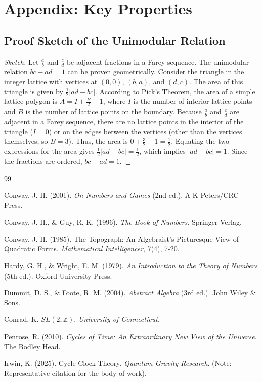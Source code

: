 \documentclass[12pt,a4paper]{article}
\theoremstyle{plain}
\theoremstyle{definition}
\theoremstyle{remark}
\begin{document}
\appendix
\section{Appendix: Key Properties}

\subsection{Proof Sketch of the Unimodular Relation}
\begin{proof}[Sketch]
Let $\frac{a}{b}$ and $\frac{c}{d}$ be adjacent fractions in a Farey sequence. The unimodular relation $bc - ad = 1$ can be proven geometrically. Consider the triangle in the integer lattice with vertices at $(0,0)$, $(b,a)$, and $(d,c)$. The area of this triangle is given by $\frac{1}{2}|ad - bc|$. According to Pick's Theorem, the area of a simple lattice polygon is $A = I + \frac{B}{2} - 1$, where $I$ is the number of interior lattice points and $B$ is the number of lattice points on the boundary. Because $\frac{a}{b}$ and $\frac{c}{d}$ are adjacent in a Farey sequence, there are no lattice points in the interior of the triangle ($I=0$) or on the edges between the vertices (other than the vertices themselves, so $B=3$). Thus, the area is $0 + \frac{3}{2} - 1 = \frac{1}{2}$. Equating the two expressions for the area gives $\frac{1}{2}|ad - bc| = \frac{1}{2}$, which implies $|ad - bc| = 1$. Since the fractions are ordered, $bc - ad = 1$.
\end{proof}

\begin{thebibliography}{99}

Conway, J. H. (2001). \textit{On Numbers and Games} (2nd ed.). A K Peters/CRC Press.

Conway, J. H., \& Guy, R. K. (1996). \textit{The Book of Numbers}. Springer-Verlag.

Conway, J. H. (1985). The Topograph: An Algebraist's Picturesque View of Quadratic Forms. \textit{Mathematical Intelligencer}, 7(4), 7-20.

Hardy, G. H., \& Wright, E. M. (1979). \textit{An Introduction to the Theory of Numbers} (5th ed.). Oxford University Press.

Dummit, D. S., \& Foote, R. M. (2004). \textit{Abstract Algebra} (3rd ed.). John Wiley \& Sons.

Conrad, K. $SL(2,\mathbb{Z})$. \textit{University of Connecticut}.

Penrose, R. (2010). \textit{Cycles of Time: An Extraordinary New View of the Universe}. The Bodley Head.

Irwin, K. (2025). Cycle Clock Theory. \textit{Quantum Gravity Research}. (Note: Representative citation for the body of work).

\end{thebibliography}
\end{document}
